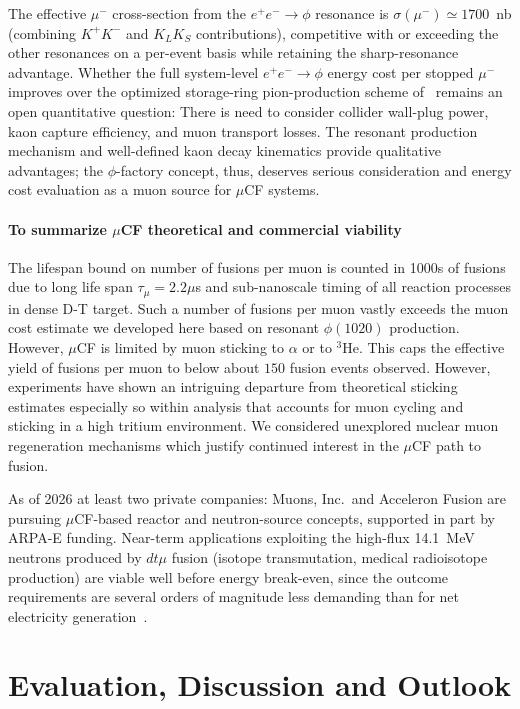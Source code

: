 \documentclass[particles,article,accept,pdftex,moreauthors]{Definitions/mdpi}
\begin{document}
The effective $\mu^-$ cross-section from the $e^+e^-\to \phi$ resonance is $\sigma(\mu^-)\simeq 1700$~nb (combining $K^+K^-$ and $K_LK_S$ contributions), competitive with or exceeding the other resonances on a per-event basis while retaining the sharp-resonance advantage. Whether the full system-level $e^+e^-\to \phi$ energy cost per stopped $\mu^-$ improves over the optimized storage-ring pion-production scheme of~\cite{Rafelski:1991DOE} remains an open quantitative question: There is need to consider collider wall-plug power, kaon capture efficiency, and muon transport losses. The resonant production mechanism and well-defined kaon decay kinematics provide qualitative advantages; the $\phi$-factory concept, thus, deserves serious consideration and energy cost evaluation as a muon source for $\mu$CF systems.

\paragraph*{\bf To summarize $\mu$CF theoretical and commercial viability}
The lifespan bound on number of fusions per muon is counted in 1000s of fusions due to long life span $\tau_\mu=2.2\mu$s and sub-nanoscale timing of all reaction processes in dense D-T target. Such a number of fusions per muon vastly exceeds the muon cost estimate we developed here based on resonant $\phi(1020)$ production. However, $\mu$CF is limited by muon sticking to $\alpha$ or to ${}^3\mathrm{He}$. This caps the effective yield of fusions per muon to below about $150$ fusion events observed. However, experiments have shown an intriguing departure from theoretical sticking estimates especially so within analysis that accounts for muon cycling and sticking in a high tritium environment. We considered unexplored nuclear muon regeneration mechanisms which justify continued interest in the $\mu$CF path to fusion.

As of 2026 at least two private companies: Muons, Inc.\ and Acceleron Fusion are pursuing $\mu$CF-based reactor and neutron-source concepts, supported in part by ARPA-E funding. Near-term applications exploiting the high-flux 14.1~MeV neutrons produced by $dt\mu$ fusion (isotope transmutation, medical radioisotope production) are viable well before energy break-even, since the outcome requirements are several orders of magnitude less demanding than for net electricity generation~\cite{Kamimura:2021msf,Yamashita:2022rtu}. 

\section{Evaluation, Discussion and Outlook}\label{sec:Dis}
\end{document}
